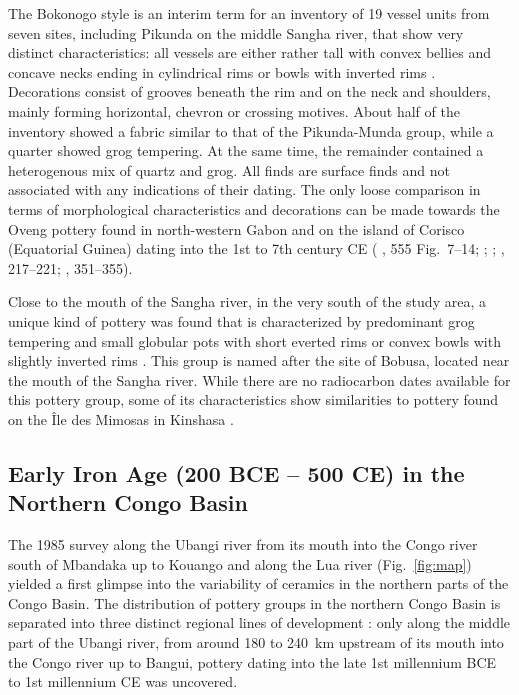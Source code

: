 \documentclass[smallextended,natbib]{svjour3}       %
\begin{document}
The Bokonogo style is an interim term for an inventory of 19 vessel units from seven sites, including Pikunda on the middle Sangha river, that show very distinct characteristics: all vessels are either rather tall with convex bellies and concave necks ending in cylindrical rims or bowls with inverted rims \citep[Fig.~\ref{fig:sangha}.4;][120--123]{Seidensticker.2021e}. Decorations consist of grooves beneath the rim and on the neck and shoulders, mainly forming horizontal, chevron or crossing motives. About half of the inventory showed a fabric similar to that of the Pikunda-Munda group, while a quarter showed grog tempering. At the same time, the remainder contained a heterogenous mix of quartz and grog. All finds are surface finds and not associated with any indications of their dating. The only loose comparison in terms of morphological characteristics and decorations can be made towards the Oveng pottery found in north-western Gabon \citep[615--618]{Clist.20042005} and on the island of Corisco (Equatorial Guinea) dating into the 1st to 7th century CE (\citeauthor{Clist.20042005} \citeyear{Clist.20042005}, 555 Fig.~7–14; \citeauthor{GonzalezRuibal.2011} \citeyear{GonzalezRuibal.2011}; \citeyear{GonzalesRuibal.2012}; \citeauthor{SanchezElipe.2015} \citeyear{SanchezElipe.2015}, 217--221; \citeauthor{SanchezElipe.2016} \citeyear{SanchezElipe.2016}, 351--355).

Close to the mouth of the Sangha river, in the very south of the study area, a unique kind of pottery was found that is characterized by predominant grog tempering and small globular pots with short everted rims or convex bowls with slightly inverted rims \citep[Fig.~\ref{fig:sangha}.6--8;][162--165]{Seidensticker.2021e}. This group is named after the site of Bobusa, located near the mouth of the Sangha river. While there are no radiocarbon dates available for this pottery group, some of its characteristics show similarities to pottery found on the Île des Mimosas in Kinshasa \citep[279--280]{Eggert.1984}.

\subsection*{Early Iron Age (200 BCE – 500 CE) in the Northern Congo Basin}

The 1985 survey along the Ubangi river from its mouth into the Congo river south of Mbandaka up to Kouango and along the Lua river (Fig.~\ref{fig:map}) yielded a first glimpse into the variability of ceramics in the northern parts of the Congo Basin. The distribution of pottery groups in the northern Congo Basin is separated into three distinct regional lines of development \citep[183--185]{Seidensticker.2021e}: only along the middle part of the Ubangi river, from around 180 to 240~km upstream of its mouth into the Congo river up to Bangui, pottery dating into the late 1st millennium BCE to 1st millennium CE was uncovered.
\end{document}

